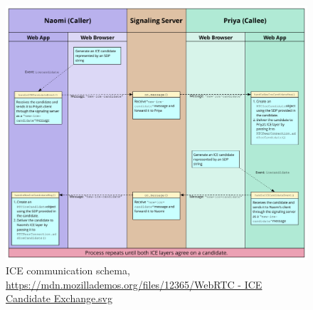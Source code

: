 \begin{figure}[H]
	\includegraphics[width=1\textwidth]{images/ICECandidateExchange.pdf}
	\centering
	\caption{ICE communication schema, \url{https://mdn.mozillademos.org/files/12365/WebRTC - ICE Candidate Exchange.svg}}
	\label{fig:ICE Candidate Exchange}
\end{figure}

